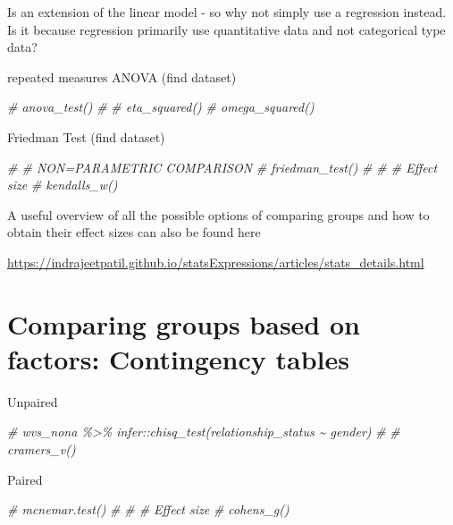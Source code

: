 \documentclass[
]{book}
\newenvironment{Shaded}{\begin{snugshade}}{\end{snugshade}}
\newcommand{\CommentTok}[1]{\textcolor[rgb]{0.56,0.35,0.01}{\textit{#1}}}
\begin{document}
Is an extension of the linear model - so why not simply use a regression instead. Is it because regression primarily use quantitative data and not categorical type data?

repeated measures ANOVA (find dataset)

\begin{Shaded}
\begin{Highlighting}[]
\CommentTok{\# anova\_test()}
\CommentTok{\# }
\CommentTok{\# eta\_squared()}
\CommentTok{\# omega\_squared()}
\end{Highlighting}
\end{Shaded}

Friedman Test (find dataset)

\begin{Shaded}
\begin{Highlighting}[]
\CommentTok{\# \# NON=PARAMETRIC COMPARISON}
\CommentTok{\# friedman\_test()}
\CommentTok{\# }
\CommentTok{\# \# Effect size}
\CommentTok{\# kendalls\_w()}
\end{Highlighting}
\end{Shaded}

A useful overview of all the possible options of comparing groups and how to obtain their effect sizes can also be found here

\url{https://indrajeetpatil.github.io/statsExpressions/articles/stats_details.html}

\hypertarget{chi-squared-test}{%
\section{Comparing groups based on factors: Contingency tables}\label{chi-squared-test}}

Unpaired

\begin{Shaded}
\begin{Highlighting}[]
\CommentTok{\# wvs\_nona \%\textgreater{}\% infer::chisq\_test(relationship\_status \textasciitilde{} gender)}
\CommentTok{\# }
\CommentTok{\# cramers\_v()}
\end{Highlighting}
\end{Shaded}

Paired

\begin{Shaded}
\begin{Highlighting}[]
\CommentTok{\# mcnemar.test()}
\CommentTok{\# }
\CommentTok{\# \# Effect size}
\CommentTok{\# cohens\_g()}
\end{Highlighting}
\end{Shaded}
\end{document}
